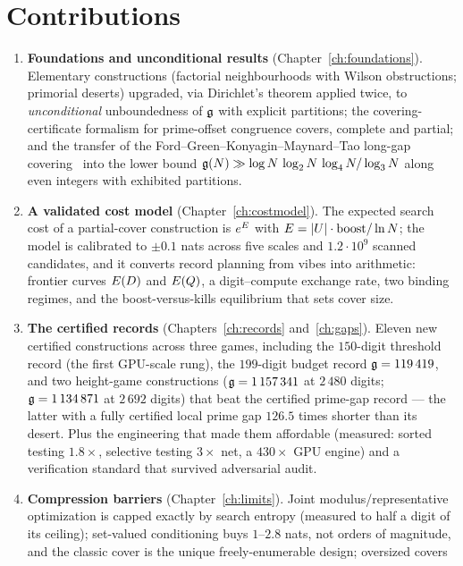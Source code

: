 \section{Contributions}

\begin{enumerate}
\item \textbf{Foundations and unconditional results}
  (Chapter~\ref{ch:foundations}). Elementary constructions (factorial
  neighbourhoods with Wilson obstructions; primorial deserts) upgraded,
  via Dirichlet's theorem applied twice, to \emph{unconditional}
  unboundedness of $\mathfrak{g}$ with explicit partitions; the covering-certificate
  formalism for prime-offset congruence covers, complete and partial; and
  the transfer of the Ford--Green--Konyagin--Maynard--Tao long-gap
  covering~\cite{FGKT,Maynard,FGKMT} into the lower bound
  $\mathfrak{g}(N)\gg\log N\,\log_2N\,\log_4N/\log_3N$ along even integers
  with exhibited partitions.
\item \textbf{A validated cost model} (Chapter~\ref{ch:costmodel}). The
  expected search cost of a partial-cover construction is $e^{E}$ with
  $E=|U|\cdot\mathrm{boost}/\ln N$; the model is calibrated to
  $\pm0.1$ nats across five scales and $1.2\cdot10^9$ scanned
  candidates, and it converts record planning from vibes into
  arithmetic: frontier curves $E(D)$ and $E(Q)$, a digit--compute
  exchange rate, two binding regimes, and the boost-versus-kills
  equilibrium that sets cover size.
\item \textbf{The certified records} (Chapters~\ref{ch:records}
  and~\ref{ch:gaps}). Eleven new certified constructions across three games,
  including the $150$-digit threshold record (the first GPU-scale rung),
  the $199$-digit budget record $\mathfrak{g}=119\,419$, and two height-game
  constructions ($\mathfrak{g}=1\,157\,341$ at $2\,480$ digits;
  $\mathfrak{g}=1\,134\,871$ at $2\,692$ digits) that beat the certified
  prime-gap record --- the latter with a fully certified local prime gap
  $126.5$ times shorter than its desert. Plus the engineering that made
  them affordable (measured: sorted testing $1.8\times$, selective
  testing $3\times$ net, a $430\times$ GPU engine) and a verification
  standard that survived adversarial audit.
\item \textbf{Compression barriers} (Chapter~\ref{ch:limits}).
  Joint modulus/representative optimization is capped exactly by search
  entropy (measured to half a digit of its ceiling); set-valued
  conditioning buys $1$--$2.8$ nats, not orders of magnitude, and the
  classic cover is the unique freely-enumerable design; oversized covers

\end{enumerate}

